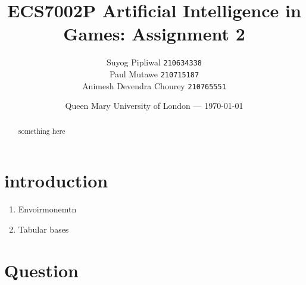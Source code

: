 \documentclass[11pt]{article}
\title{ECS7002P Artificial Intelligence in Games: Assignment 2} %
\author{Suyog Pipliwal \texttt{210634338}\\ 
			Paul Mutawe \texttt{210715187} \\ 
			Animesh Devendra Chourey \texttt{210765551}
} %
\date{Queen Mary University of London --- \today} %
\begin{document}
	\maketitle
\begin{abstract}
	something here
\end{abstract}
\section{introduction}
	\begin{enumerate}
		\item Envoirmonemtn
		\item Tabular bases
			\
	\end{enumerate}
\section {Question}
\end{document}
